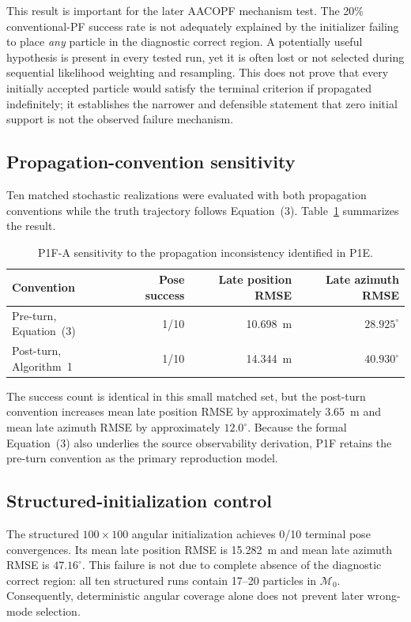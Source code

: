 This result is important for the later AACOPF mechanism test. The 20\% conventional-PF success rate is not adequately explained by the initializer failing to place \emph{any} particle in the diagnostic correct region. A potentially useful hypothesis is present in every tested run, yet it is often lost or not selected during sequential likelihood weighting and resampling. This does not prove that every initially accepted particle would satisfy the terminal criterion if propagated indefinitely; it establishes the narrower and defensible statement that zero initial support is not the observed failure mechanism.

\subsection{Propagation-convention sensitivity}
Ten matched stochastic realizations were evaluated with both propagation conventions while the truth trajectory follows Equation~(3). Table~\ref{tab:p1fa_prop} summarizes the result.
\begin{table}[ht]
\centering
\caption{P1F-A sensitivity to the propagation inconsistency identified in P1E.}
\label{tab:p1fa_prop}
\begin{tabular}{lrrr}
\toprule
Convention & Pose success & Late position RMSE & Late azimuth RMSE\\
\midrule
Pre-turn, Equation~(3) & 1/10 & \SI{10.698}{m} & $28.925^\circ$\\
Post-turn, Algorithm~1 & 1/10 & \SI{14.344}{m} & $40.930^\circ$\\
\bottomrule
\end{tabular}
\end{table}
The success count is identical in this small matched set, but the post-turn convention increases mean late position RMSE by approximately \SI{3.65}{m} and mean late azimuth RMSE by approximately $12.0^\circ$. Because the formal Equation~(3) also underlies the source observability derivation, P1F retains the pre-turn convention as the primary reproduction model.

\subsection{Structured-initialization control}
The structured $100\times100$ angular initialization achieves 0/10 terminal pose convergences. Its mean late position RMSE is \SI{15.282}{m} and mean late azimuth RMSE is $47.16^\circ$. This failure is not due to complete absence of the diagnostic correct region: all ten structured runs contain 17--20 particles in $\mathcal M_0$. Consequently, deterministic angular coverage alone does not prevent later wrong-mode selection.

